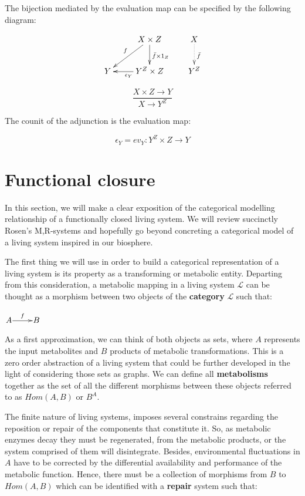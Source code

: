 \documentclass[aps,twocolumn]{revtex4-1}
\begin{document}
The bijection mediated by the evaluation map can be specified by the following diagram:

			$$
			\xymatrix{
			& X \times Z \ar[d]^{\bar{f} \times 1_Z} \ar[dl]_{f} & X \ar@{.>}[d]^{\bar{f}}\\
			Y & Y^Z \times Z \ar[l]^{\epsilon_Y} & Y^Z}
			$$

		$$
			\frac{X \times Z \longrightarrow Y}{X \longrightarrow Y^Z}
		$$
		
The counit of the adjunction is the evaluation map:

		$$
			\epsilon_Y = ev_Y \colon Y^Z \times Z \longrightarrow Y
		$$
	
	
\section{Functional closure}

In this section, we will make a clear exposition of the categorical modelling relationship of a functionally closed living system. We will review succinctly Rosen's M,R-systems and hopefully go beyond concreting a categorical model of a living system inspired in our biosphere.

The first thing we will use in order to build a categorical representation of a living system is its property as a transforming or metabolic entity. Departing from this consideration, a metabolic mapping in a living system $\mathcal{L}$ can be thought as a morphism between two objects of the \textbf{category} $\mathcal{L}$ such that:

\begin{center}
	$\xymatrix@1{
	A\ar[r]^-{f} & B
	}$

\end{center}

As a first approximation, we can think of both objects as sets, where $A$ represents the input metabolites and $B$  products of metabolic transformations. This is a zero order abstraction of a living system that could be further developed in the light of considering those sets as graphs. We can define all \textbf{metabolisms} together as the set of all the different morphisms between these objects referred to as $Hom(A,B)$ or $B^A$.

The finite nature of living systems, imposes several constrains regarding the reposition or repair of the components that constitute it. So, as metabolic enzymes decay they must be regenerated, from the metabolic products, or the system comprised of them will disintegrate. Besides, environmental fluctuations in $A$ have to be corrected by the differential availability and performance of the metabolic function. Hence, there must be a collection of morphisms from $B$ to $Hom(A,B)$ which can be identified with a \textbf{repair} system such that:
\end{document}
